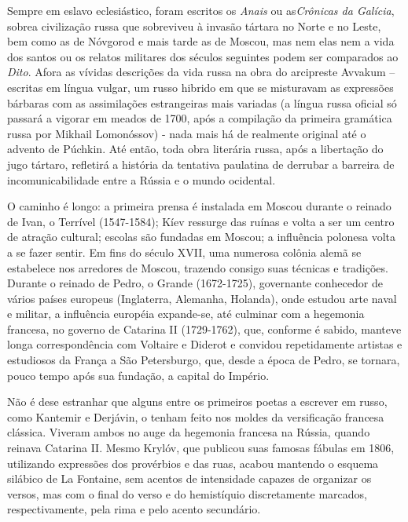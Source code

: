Sempre em eslavo eclesiástico, foram escritos os \emph{Anais} ou
as\emph{Crônicas da Galícia}, sobrea civilização russa que sobreviveu à
invasão tártara no Norte e no Leste, bem como as de Nóvgorod e mais
tarde as de Moscou, mas nem elas nem a vida dos santos ou os relatos
militares dos séculos seguintes podem ser comparados ao \emph{Dito}.
Afora as vívidas descrições da vida russa na obra do arcipreste Avvakum
-- escritas em língua vulgar, um russo hibrido em que se misturavam as
expressões bárbaras com as assimilações estrangeiras mais variadas (a
língua russa oficial só passará a vigorar em meados de 1700, após a
compilação da primeira gramática russa por Mikhail Lomonóssov) - nada
mais há de realmente original até o advento de Púchkin. Até então, toda
obra literária russa, após a libertação do jugo tártaro, refletirá a
história da tentativa paulatina de derrubar a barreira de
incomunicabilidade entre a Rússia e o mundo ocidental.

O caminho é longo: a primeira prensa é instalada em Moscou durante o
reinado de Ivan, o Terrível (1547-1584); Kíev ressurge das ruínas e
volta a ser um centro de atração cultural; escolas são fundadas em
Moscou; a influência polonesa volta a se fazer sentir. Em fins do século
XVII, uma numerosa colônia alemã se estabelece nos arredores de Moscou,
trazendo consigo suas técnicas e tradições. Durante o reinado de Pedro,
o Grande (1672-1725), governante conhecedor de vários países europeus
(Inglaterra, Alemanha, Holanda), onde estudou arte naval e militar, a
influência européia expande-se, até culminar com a hegemonia francesa,
no governo de Catarina II (1729-1762), que, conforme é sabido, manteve
longa correspondência com Voltaire e Diderot e convidou repetidamente
artistas e estudiosos da França a São Petersburgo, que, desde a época de
Pedro, se tornara, pouco tempo após sua fundação, a capital do Império.

Não é dese estranhar que alguns entre os primeiros poetas a escrever em
russo, como Kantemir e Derjávin, o tenham feito nos moldes da
versificação francesa clássica. Viveram ambos no auge da hegemonia
francesa na Rússia, quando reinava Catarina II. Mesmo Krylóv, que
publicou suas famosas fábulas em 1806, utilizando expressões dos
provérbios e das ruas, acabou mantendo o esquema silábico de La
Fontaine, sem acentos de intensidade capazes de organizar os versos, mas
com o final do verso e do hemistíquio discretamente marcados,
respectivamente, pela rima e pelo acento secundário.

